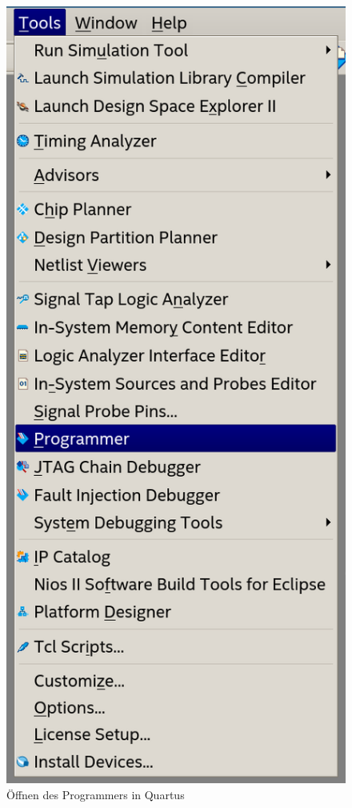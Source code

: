     \begin{figure}[H]
        \centering
        \includegraphics[scale=0.6]{img/quartus_programmer.png}
        \caption{Öffnen des Programmers in Quartus}
        \label{fig:quartus_programmer}
    \end{figure}

